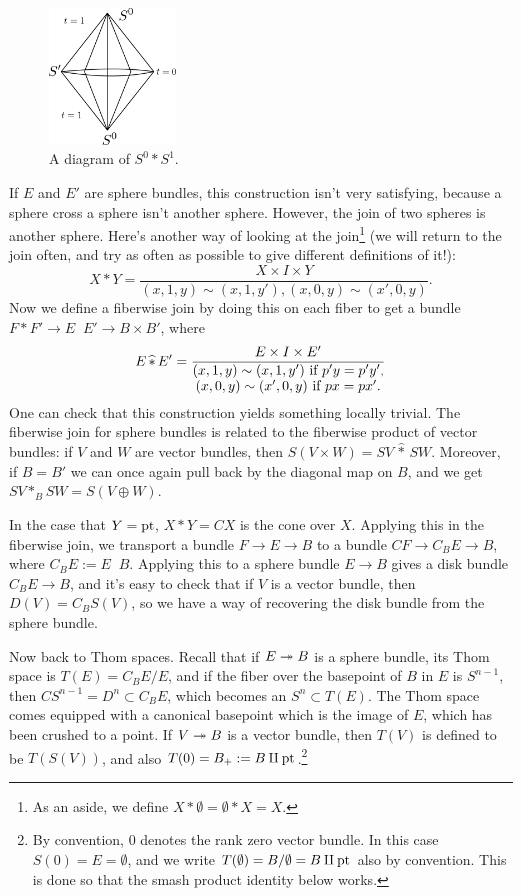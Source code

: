 \begin{figure} %
\centering\includegraphics[width=0.3\textwidth]{figures/fig9.pdf}
\caption{\small A diagram of $S^0 \ast S^1$.}
\end{figure}
If $E$ and $E'$ are sphere bundles, this construction isn't very satisfying, because a sphere cross a sphere isn't another sphere.  However, the join of two spheres is another sphere.  Here's another way of looking at the join\footnote{As an aside, we define $X \ast \emptyset = \emptyset \ast X = X$.} (we will return to the join often, and try as often as possible to give different definitions of it!):
\[
X \ast Y = \frac{X \times I \times Y}{(x, 1, y) \sim (x, 1, y'), (x, 0, y) \sim (x', 0, y)}.
\]
Now we define a fiberwise join by doing this on each fiber to get a bundle $F \ast F' \to E\mathop{\widehat\ast}E' \to B \times B'$, where \[E\mathop{\widehat\ast}E' = \frac{E \times I \times E'}{\substack{\hbox{$(x, 1, y) \sim (x, 1, y')$ if $p'y = p'y'$}, \\ \hbox{$(x, 0, y) \sim (x', 0, y)$ if $px = px'$.}}}\]  One can check that this construction yields something locally trivial.  The fiberwise join for sphere bundles is related to the fiberwise product of vector bundles: if $V$ and $W$ are vector bundles, then $S(V \times W) = SV \,\widehat \ast \,SW$.  Moreover, if $B = B'$ we can once again pull back by the diagonal map on $B$, and we get $SV \ast_B SW = S(V \oplus W)$.

In the case that $Y = \mathrm{pt}$, $X \ast Y = CX$ is the cone over $X$.  Applying this in the fiberwise join, we transport a bundle $F \to E \to B$ to a bundle $CF \to C_B E \to B$, where $C_BE:=E\mathop{\widehat\ast}B$.  Applying this to a sphere bundle $E \to B$ gives a disk bundle $C_B E \to B$, and it's easy to check that if $V$ is a vector bundle, then $D(V) = C_B S(V)$, so we have a way of recovering the disk bundle from the sphere bundle.

Now back to Thom spaces.  Recall that if $E \twoheadrightarrow B$ is a sphere bundle, its Thom space is $T(E) = C_B E / E$, and if the fiber over the basepoint of $B$ in $E$ is $S^{n-1}$, then $CS^{n-1} = D^n \subset C_B E$, which becomes an $S^n \subset T(E)$.  The Thom space comes equipped with a canonical basepoint which is the image of $E$, which has been crushed to a point.  If $V \twoheadrightarrow B$ is a vector bundle, then $T(V)$ is defined to be $T(S(V))$, and also $T(0) = B_+:=B \amalg \mathrm{pt}$.\footnote{By convention, $0$ denotes the rank zero vector bundle.  In this case $S(0) = E = \emptyset$, and we write $T(\emptyset) = B / \emptyset = B \amalg \mathrm{pt}$ also by convention.  This is done so that the smash product identity below works.}

